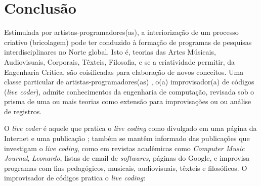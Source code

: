 \chapter*[Conclusão]{Conclusão}\label{conclusao}


Estimulada por artistas-programadores(as), a interiorização de um processo criativo (bricolagem) pode ter conduzido à formação de programas de pesquisas interdisciplinares no Norte global. Isto é, teorias das Artes Músicais, Audiovisuais, Corporais, Têxteis, Filosofia, e se a criatividade permitir, da Engenharia Crítica, são coisificadas para elaboração de novos conceitos. Uma classe particular de artistas-programadores(as) \cite[p.~16]{McLean2011}, o(a) improvisador(a) de códigos (\emph{live coder}), admite conhecimentos da engenharia de computação, revisada sob o prisma de uma ou mais teorias   como extensão para improvisações ou ou análise de registros.

O \emph{live coder} é aquele que pratica o \emph{live coding} como divulgado em uma página da Internet e uma publicação \cite{ward_live_2004}; também se mantêm informado das publicações que investigam o \emph{live coding}, como em revistas acadêmicas como \emph{Computer Music Journal}, \emph{Leonardo}, listas de email de \emph{softwares}, páginas do Google, e improvisa programas com fins pedagógicos, musicais, audiovisuais, têxteis e filosóficos. O improvisador de códigos pratica o \emph{live coding}:


